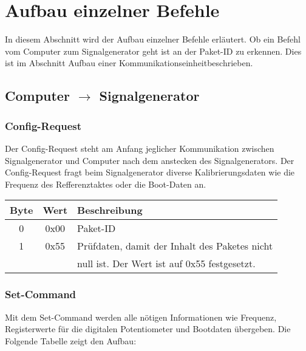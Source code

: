 \section{Aufbau einzelner Befehle}
In diesem Abschnitt wird der Aufbau einzelner Befehle erläutert. Ob ein Befehl vom Computer zum Signalgenerator geht ist an der Paket-ID zu erkennen. Dies ist im Abschnitt \glqq Aufbau einer Kommunikationseinheit\grqq beschrieben.

\pagebreak
\subsection{Computer $\rightarrow$ Signalgenerator}

\subsubsection{Config-Request}
Der Config-Request steht am Anfang jeglicher Kommunikation zwischen Signalgenerator und Computer nach dem anstecken des Signalgenerators. Der Config-Request fragt beim Signalgenerator diverse Kalibrierungsdaten wie die Frequenz des Refferenztaktes oder die Boot-Daten an.

\begin{flushleft}
\begin{tabular}{c||c|l}
Byte & Wert & Beschreibung \\
\hline
\hline
0 & 0x00 & Paket-ID \\
\hline
1 & 0x55 & Prüfdaten, damit der Inhalt des Paketes nicht \\
& & null ist. Der Wert ist auf 0x55 festgesetzt.\\
\end{tabular}
\end{flushleft}

\subsubsection{Set-Command}
Mit dem Set-Command werden alle nötigen Informationen wie Frequenz, Registerwerte für die digitalen Potentiometer und Bootdaten übergeben. Die Folgende Tabelle zeigt den Aufbau:
\linebreak

